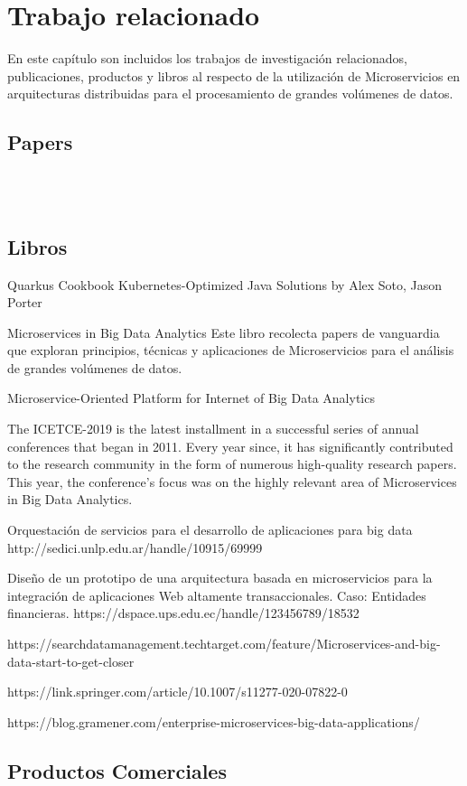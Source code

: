 \chapter{Trabajo relacionado}

En este capítulo son incluidos  los trabajos de investigación relacionados, publicaciones, productos y libros al respecto de la utilización de Microservicios en arquitecturas distribuidas para el procesamiento de grandes volúmenes de datos.
\\

\section{Papers}


\\

\\
 

\section{Libros}

Quarkus Cookbook Kubernetes-Optimized Java Solutions by Alex Soto, Jason Porter

\par


Microservices in Big Data Analytics
\cite{MicroservicesInBigDataAnalytics}
Este libro recolecta papers de vanguardia que exploran principios, técnicas y aplicaciones de Microservicios para el análisis de grandes volúmenes de datos.
\par

Microservice-Oriented Platform for Internet of Big Data Analytics
\cite{3084568720190306}

\par




The ICETCE-2019 is the latest installment in a successful series of annual conferences that began in 2011. Every year since, it has significantly contributed to the research community in the form of numerous high-quality research papers. This year, the conference’s focus was on the highly relevant area of Microservices in Big Data Analytics.


Orquestación de servicios para el desarrollo de aplicaciones para big data
http://sedici.unlp.edu.ar/handle/10915/69999


Diseño de un prototipo de una arquitectura basada en microservicios para la integración de aplicaciones Web altamente transaccionales. Caso: Entidades financieras.
https://dspace.ups.edu.ec/handle/123456789/18532

https://searchdatamanagement.techtarget.com/feature/Microservices-and-big-data-start-to-get-closer

https://link.springer.com/article/10.1007/s11277-020-07822-0

https://blog.gramener.com/enterprise-microservices-big-data-applications/

\section{Productos Comerciales}